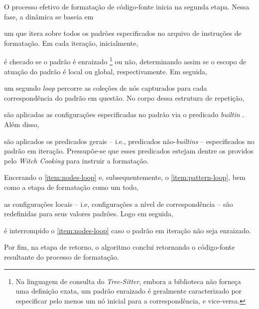 \documentclass
  [11pt,a4paper,english,brazil,openright,sumario=tradicional,twoside]
  {abntex2}
\newcommand{\treesitter}{\textit{Tree-Sitter}\xspace}
\newcommand{\witchcooking}{\textit{Witch Cooking}\xspace}
\begin{document}
{{  O processo efetivo de formatação de código-fonte inicia na segunda etapa.
  Nessa fase, a dinâmica se baseia em
  \begin{inparaenum}
    \item \label{item:pattern-loop} um \textit{} que itera sobre
          todos os padrões especificados no arquivo de instruções de
          formatação. Em cada iteração, inicialmente,
    \item é checado se o padrão é enraizado%
          \footnote
            { Na linguagem de consulta do \treesitter, embora a biblioteca não
              forneça uma definição exata, um padrão enraizado é geralmente
              caracterizado por especificar pelo menos um nó inicial para a
              correspondência, e vice-versa.}
          ou não, determinando assim se o escopo de atuação do padrão é local
          ou global, respectivamente. Em seguida,
    \item \label{item:nodes-loop} um segundo \textit{loop} percorre as coleções
          de nós capturados para cada correspondência do padrão em questão. No
          corpo dessa estrutura de repetição,
    \item são aplicadas as configurações especificadas no padrão via o
          predicado \textit{builtin} . Além disso,
    \item são aplicados os predicados gerais -- i.e., predicados
          não-\textit{builtins} -- especificados no padrão em iteração.
          Pressupõe-se que esses predicados estejam dentre os providos pelo
          \witchcooking para instruir a formatação.

          Encerando o \cref{item:nodes-loop} e, subsequentemente, o
          \cref{item:pattern-loop}, bem como a etapa de formatação como um
          todo,
    \item as configurações locais -- i.e, configurações a nível de
          correspondência -- são redefinidas para seus valores padrões. Logo em
          seguida,
    \item é interrompido o \cref{item:nodes-loop} caso o padrão em iteração não
          seja enraizado.
  \end{inparaenum}
  Por fim, na etapa de retorno, o algoritmo conclui retornando o código-fonte
  resultante do processo de formatação.

}}
\end{document}
